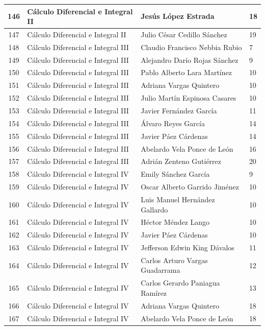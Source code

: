 {\begin{longtable}{|c|p{6.5cm}|p{5cm}|p{1.5cm}|}
146 & Cálculo Diferencial e Integral II & Jesús López Estrada & 18 \\ \hline
147 & Cálculo Diferencial e Integral II & Julio César Cedillo Sánchez & 19 \\ \hline
148 & Cálculo Diferencial e Integral III & Claudio Francisco Nebbia Rubio & 7 \\ \hline
149 & Cálculo Diferencial e Integral III & Alejandro Darío Rojas Sánchez & 9 \\ \hline
150 & Cálculo Diferencial e Integral III & Pablo Alberto Lara Martínez & 10 \\ \hline
151 & Cálculo Diferencial e Integral III & Adriana Vargas Quintero & 10 \\ \hline
152 & Cálculo Diferencial e Integral III & Julio Martín Espinosa Casares & 10 \\ \hline
153 & Cálculo Diferencial e Integral III & Javier Fernández García & 11 \\ \hline
154 & Cálculo Diferencial e Integral III & Álvaro Reyes García & 14 \\ \hline
155 & Cálculo Diferencial e Integral III & Javier Páez Cárdenas & 14 \\ \hline
156 & Cálculo Diferencial e Integral III & Abelardo Vela Ponce de León & 16 \\ \hline
157 & Cálculo Diferencial e Integral III & Adrián Zenteno Gutiérrez & 20 \\ \hline
158 & Cálculo Diferencial e Integral IV & Emily Sánchez García & 9 \\ \hline
159 & Cálculo Diferencial e Integral IV & Oscar Alberto Garrido Jiménez & 10 \\ \hline
160 & Cálculo Diferencial e Integral IV & Luis Manuel Hernández Gallardo & 10 \\ \hline
161 & Cálculo Diferencial e Integral IV & Héctor Méndez Lango & 10 \\ \hline
162 & Cálculo Diferencial e Integral IV & Javier Páez Cárdenas & 10 \\ \hline
163 & Cálculo Diferencial e Integral IV & Jefferson Edwin King Dávalos & 11 \\ \hline
164 & Cálculo Diferencial e Integral IV & Carlos Arturo Vargas Guadarrama & 12 \\ \hline
165 & Cálculo Diferencial e Integral IV & Carlos Gerardo Paniagua Ramírez & 13 \\ \hline
166 & Cálculo Diferencial e Integral IV & Adriana Vargas Quintero & 18 \\ \hline
167 & Cálculo Diferencial e Integral IV & Abelardo Vela Ponce de León & 18 \\ \hline

\end{longtable}}
